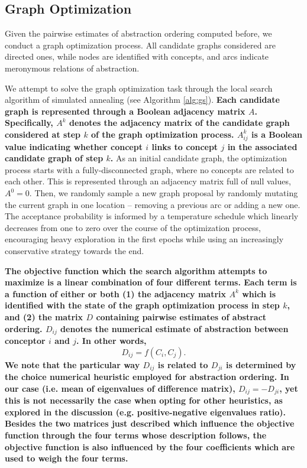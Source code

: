 \subsection{Graph Optimization}

Given the pairwise estimates of abstraction ordering computed before, we conduct a graph optimization process. All candidate graphs considered are directed ones, while nodes are identified with concepts, and arcs indicate meronymous relations of abstraction.

We attempt to solve the graph optimization task through the local search algorithm of simulated annealing (see Algorithm \ref{alg:gs}). \textbf{Each candidate graph is represented through a Boolean adjacency matrix $A$. Specifically, $A^k$ denotes the adjacency matrix of the candidate graph considered at step $k$ of the graph optimization process. $A^k_{ij}$ is a Boolean value indicating whether concept $i$ links to concept $j$ in the associated candidate graph of step $k$.} As an initial candidate graph, the optimization process starts with a fully-disconnected graph, where no concepts are related to each other. This is represented through an adjacency matrix full of null values, $A^0 = 0$. Then, we randomly sample a new graph proposal by randomly mutating the current graph in one location -- removing a previous arc or adding a new one. The acceptance probability is informed by a temperature schedule which linearly decreases from one to zero over the course of the optimization process, encouraging heavy exploration in the first epochs while using an increasingly conservative strategy towards the end.

\textbf{The objective function which the search algorithm attempts to maximize is a linear combination of four different terms. Each term is a function of either or both (1) the adjacency matrix $A^k$ which is identified with the state of the graph optimization process in step $k$, and (2) the matrix $D$ containing pairwise estimates of abstract ordering. $D_{ij}$ denotes the numerical estimate of abstraction between conceptor $i$ and $j$. In other words, $$D_{ij} = f(C_i, C_j).$$ We note that the particular way $D_{ij}$ is related to $D_{ji}$ is determined by the choice numerical heuristic employed for abstraction ordering. In our case (i.e. mean of eigenvalues of difference matrix), $D_{ij} = -D_{ji}$, yet this is not necessarily the case when opting for other heuristics, as explored in the discussion (e.g. positive-negative eigenvalues ratio). Besides the two matrices just described which influence the objective function through the four terms whose description follows, the objective function is also influenced by the four coefficients which are used to weigh the four terms.}

